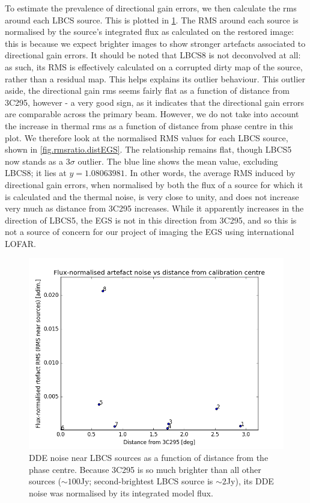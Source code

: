\pg
To estimate the prevalence of directional gain errors, we then calculate the rms around each LBCS source. This is plotted in \cref{fig.dderms.distEGS}. The RMS around each source is normalised by the source's integrated flux as calculated on the restored image: this is because we expect brighter images to show stronger artefacts associated to directional gain errors. It should be noted that LBCS8 is not deconvolved at all: as such, its RMS is effectively calculated on a corrupted dirty map of the source, rather than a residual map. This helps explains its outlier behaviour. This outlier aside, the directional gain rms seems fairly flat as a function of distance from 3C295, however - a very good sign, as it indicates that the directional gain errors are comparable across the primary beam. However, we do not take into account the increase in thermal rms as a function of distance from phase centre in this plot. We therefore look at the normalised RMS values for each LBCS source, shown in \cref{fig.rmsratio.distEGS}. The relationship remains flat, though LBCS5 now stands as a $3\sigma$ outlier. The blue line shows the mean value, excluding LBCS8; it lies at $y=1.08063981$. In other words, the average RMS induced by directional gain errors, when normalised by both the flux of a source for which it is calculated and the thermal noise, is very close to unity, and does not increase very much as distance from 3C295 increases. While it apparently increases in the direction of LBCS5, the EGS is not in this direction from 3C295, and so this is not a source of concern for our project of imaging the EGS using international LOFAR.
\begin{figure}[h!]
\includegraphics[width=0.8\linewidth]{images/ArtefactRMSvsDistFrom3c295.png}
\caption{DDE noise near LBCS sources as a function of distance from the phase centre. Because 3C295 is so much brighter than all other sources ($\sim100$Jy; second-brightest LBCS source is $\sim2$Jy), its DDE noise was normalised by its integrated model flux.}
\label{fig.dderms.distEGS}
\end{figure}
